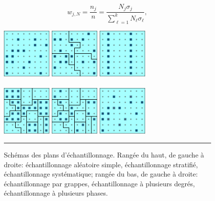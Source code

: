 $$w_{j,N}=\frac{n_j}{n}=\frac{N_j\sigma_j}{\sum_{\ell=1}^kN_{\ell}\sigma_{\ell}},$$ \begin{figure}[t]
\centering
\includegraphics[width=0.22\textwidth]{Images/Sampling_SRS.png}\qquad
\includegraphics[width=0.22\textwidth]{Images/Sampling_StS.png}\qquad
\includegraphics[width=0.22\textwidth]{Images/Sampling_SyS.png}
\\ \ \\
\includegraphics[width=0.22\textwidth]{Images/Sampling_ClS.png}\qquad
\includegraphics[width=0.22\textwidth]{Images/Sampling_MSS.png}\qquad
\includegraphics[width=0.22\textwidth]{Images/Sampling_MPS.png}
\caption{\small Schémas des plans d'échantillonnage. Rangée du haut, de gauche à droite: échantillonnage aléatoire simple, échantillonnage stratifié, échantillonnage systématique; rangée du bas, de gauche à droite: échantillonnage par grappes, échantillonnage à plusieurs degrés, échantillonnage à plusieurs phases.}
\hrule\label{fig:designs}
\end{figure}
